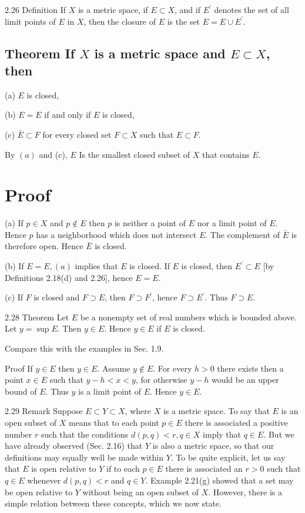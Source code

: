 \documentclass[10pt]{article}
\begin{document}
2.26 Definition If $X$ is a metric space, if $E \subset X$, and if $E^{\prime}$ denotes the set of all limit points of $E$ in $X$, then the closure of $E$ is the set $E=E \cup E^{\prime}$.

\subsection{Theorem If $X$ is a metric space and $E \subset X$, then}
(a) $E$ is closed,

(b) $E=E$ if and only if $E$ is closed,

(c) $\bar{E} \subset F$ for every closed set $F \subset X$ such that $E \subset F$.

By $(a)$ and (c), $E$ Is the smallest closed subset of $X$ that contains $E$.

\section{Proof}
(a) If $p \in X$ and $p \notin E$ then $p$ is neither a point of $E$ nor a limit point of $E$. Hence $p$ has a neighborhood which does not intersect $E$. The complement of $\bar{E}$ is therefore open. Hence $\bar{E}$ is closed.

(b) If $E=E,(a)$ implies that $E$ is closed. If $E$ is closed, then $E^{\prime} \subset E$ [by Definitions 2.18(d) and 2.26], hence $E=E$.

(c) If $F$ is closed and $F \supset E$, then $F \supset F^{\prime}$, hence $F \supset E^{\prime}$. Thus $F \supset E$.

2.28 Theorem Let $E$ be a nonempty set of real numbers which is bounded above. Let $y=\sup E$. Then $y \in E$. Hence $y \in E$ if $E$ is closed.

Compare this with the examples in Sec. 1.9.

Proof If $y \in E$ then $y \in E$. Assume $y \notin E$. For every $h>0$ there exists then a point $x \in E$ such that $y-h<x<y$, for otherwise $y-h$ would be an upper bound of $E$. Thus $y$ is a limit point of $E$. Hence $y \in E$.

2.29 Remark Suppose $E \subset Y \subset X$, where $X$ is a metric space. To say that $E$ is an open subset of $X$ means that to each point $p \in E$ there is associated a positive number $r$ such that the conditions $d(p, q)<r, q \in X$ imply that $q \in E$. But we have already observed (Sec. 2.16) that $Y$ is also a metric space, so that our definitions may equally well be made within $Y$. To be quite explicit, let us say that $E$ is open relative to $Y$ if to each $p \in E$ there is associated an $r>0$ such that $q \in E$ whenever $d(p, q)<r$ and $q \in Y$. Example 2.21(g) showed that a set may be open relative to $Y$ without being an open subset of $X$. However, there is a simple relation between these concepts, which we now state.
\end{document}
